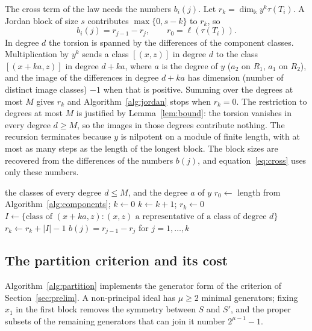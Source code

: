 \documentclass[11pt]{article}
\theoremstyle{definition}
\theoremstyle{remark}
\newcommand{\kk}{\Bbbk}
\newcommand{\tor}{\tau}
\newcommand{\len}{\ell}
\begin{document}
The cross term of the law needs the numbers $b_i(j)$. Let $r_k=\dim_\kk y^k\tor(T_i)$. A Jordan block of size $s$ contributes
$\max\{0,s-k\}$ to $r_k$, so
\begin{equation}\label{eq:jordan}
b_i(j)=r_{j-1}-r_j,\qquad r_0=\len(\tor(T_i)).
\end{equation}
In degree $d$ the torsion is spanned by the differences of the component classes. Multiplication by $y^k$ sends a class
$[(x,z)]$ in degree $d$ to the class $[(x+ka,z)]$ in degree $d+ka$, where $a$ is the degree of $y$ ($a_2$ on $R_1$,
$a_1$ on $R_2$), and the image of the differences in degree $d+ka$ has dimension (number of distinct image classes)
$-1$ when that is positive. Summing over the degrees at most $M$ gives $r_k$ and Algorithm~\ref{alg:jordan} stops when $r_k=0$. The restriction to degrees at most $M$ is justified by Lemma~\ref{lem:bound}: the
torsion vanishes in every degree $d\ge M$, so the images in those degrees contribute nothing. The recursion terminates because $y$ is nilpotent on a module of finite length, with at most as many
steps as the length of the longest block. The block sizes are recovered from the differences of the numbers $b(j)$, and equation~\eqref{eq:cross} uses only these numbers.

\begin{algorithm}[t]
\caption{Jordan type of $y$ on $\tor(I_A\otimes I_{A^*})$ from the classes of Algorithm~\ref{alg:components}.}\label{alg:jordan}
\begin{algorithmic}[1]
\Require the classes of every degree $d\le M$, and the degree $a$ of $y$
\State $r_0\gets$ length from Algorithm~\ref{alg:components}; $k\gets0$
  \State $k\gets k+1$; $r_k\gets0$
    \State $I\gets\{\text{class of }(x+ka,z):(x,z)\text{ a representative of a class of degree }d\}$
    \State $r_k\gets r_k+|I|-1$
  \EndFor
\EndWhile
\State \Return $b(j)=r_{j-1}-r_j$ for $j=1,\dots,k$
\end{algorithmic}
\end{algorithm}

\subsection{The partition criterion and its cost}

Algorithm~\ref{alg:partition} implements the generator form of the criterion of Section~\ref{sec:prelim}. A non-principal
ideal has $\mu\ge2$ minimal generators; fixing $x_1$ in the first block removes the symmetry between $S$ and $S'$, and the
proper subsets of the remaining generators that can join it number $2^{\mu-1}-1$.
\end{document}
